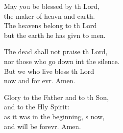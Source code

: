 \begin{psalmverse}
\begin{patverse}
May you be blessed by th Lord,\Med\\
the maker of heavn and earth.\\
The heavens belong to th Lord\Med\\
but the earth he has givn to men.

The dead shall not praise th Lord,\Med\\
nor those who go down int the silence.\\
But we who live bless th Lord\Med\\
now and for evr. Amen.

Glory to the Father and to th Son,\Med\\
and to the Hly Spirit:\\
as it was in the beginning, \pointup{\i}s now,\Med\\
and will be forevr. Amen. 
  \end{patverse}
\end{psalmverse}
